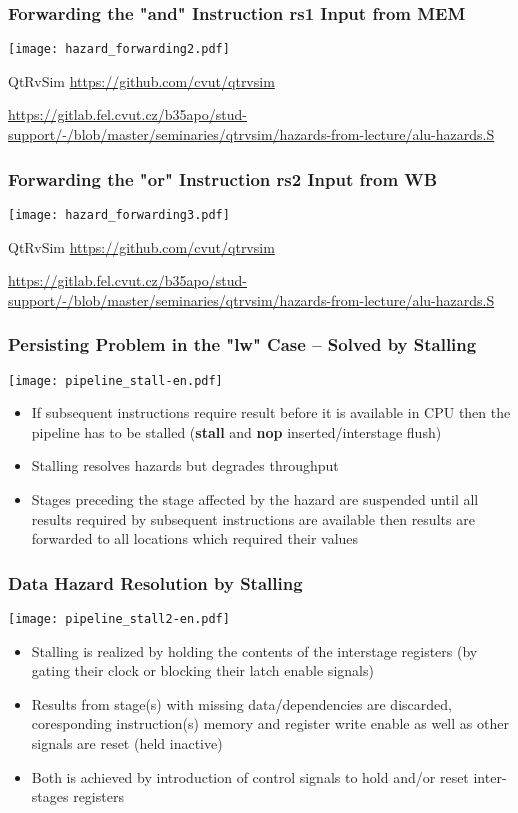 \documentclass{beamer}
\begin{document}
\begin{frame}
\frametitle{Forwarding the "and" Instruction rs1 Input from MEM}
\texttt{[image: hazard\_forwarding2.pdf]}

{\tiny
QtRvSim \url{https://github.com/cvut/qtrvsim}
}

{\Tiny
\url{https://gitlab.fel.cvut.cz/b35apo/stud-support/-/blob/master/seminaries/qtrvsim/hazards-from-lecture/alu-hazards.S}
}

\end{frame}

\begin{frame}
\frametitle{Forwarding the "or" Instruction rs2 Input from WB}
\texttt{[image: hazard\_forwarding3.pdf]}

{\tiny
QtRvSim \url{https://github.com/cvut/qtrvsim}
}

{\Tiny
\url{https://gitlab.fel.cvut.cz/b35apo/stud-support/-/blob/master/seminaries/qtrvsim/hazards-from-lecture/alu-hazards.S}
}

\end{frame}

\begin{frame}
\frametitle{Persisting Problem in the "lw" Case -- Solved by Stalling}
\texttt{[image: pipeline\_stall-en.pdf]}

\begin{itemize}
 \item If subsequent instructions require result before it is available in CPU then the pipeline has to be stalled (\textbf{stall} and \textbf{nop} inserted/interstage flush)
 \item Stalling resolves hazards but degrades throughput
 \item Stages preceding the stage affected by the hazard are suspended until all results required by subsequent instructions are available then results are forwarded to all locations which required their values
\end{itemize}

\end{frame}

\begin{frame}
\frametitle{Data Hazard Resolution by Stalling}
\texttt{[image: pipeline\_stall2-en.pdf]}

\begin{itemize}
 \item Stalling is realized by holding the contents of the interstage registers
       (by gating their clock or blocking their latch enable signals)
 \item Results from stage(s) with missing data/dependencies are discarded, coresponding instruction(s) memory and register write enable as well as other signals are reset (held inactive)
 \item Both is achieved by introduction of control signals to hold and/or reset inter-stages registers
\end{itemize}

\end{frame}
\end{document}
